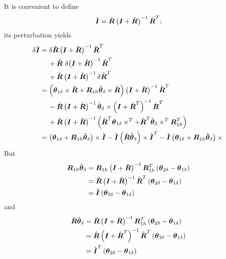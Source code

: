 \documentclass[10pt,dvips,fleqn]{report}
\newcommand{\T}[1]{\boldsymbol{#1}}
\begin{document}
It is convenient to define
\begin{equation}
	\hat{\T{I}} =
		\hat{\T{R}} \plbr{\T{I} + \tilde{\T{R}}}^{-1} \hat{\T{R}}^T ;
\end{equation}
its perturbation yields
\begin{align}
	\delta\hat{\T{I}}
	&= \delta\hat{\T{R}} \plbr{\T{I} + \tilde{\T{R}}}^{-1} \hat{\T{R}}^T
	\nonumber \\
	& \mbox{\hspace{12pt}}
	+ \hat{\T{R}} \ \delta\! \plbr{\T{I} + \tilde{\T{R}}}^{-1} \hat{\T{R}}^T
	\nonumber \\
	& \mbox{\hspace{12pt}}
	+ \hat{\T{R}} \plbr{\T{I} + \tilde{\T{R}}}^{-1} \delta\hat{\T{R}}^T \\
	&= \plbr{
		\T{\theta}_{1\delta} \times \hat{\T{R}}
		+ \T{R}_{1h} \tilde{\T{\theta}}_{\delta} \times \tilde{\T{R}}
	} \plbr{\T{I} + \tilde{\T{R}}}^{-1} \hat{\T{R}}^T
	\nonumber \\
	& \mbox{\hspace{12pt}}
	- \hat{\T{R}} \plbr{\T{I} + \tilde{\T{R}}}^{-1}
		\tilde{\T{\theta}}_{\delta} \times
		\plbr{\T{I} + \tilde{\T{R}}^T}^{-1}
		\hat{\T{R}}^T
	\nonumber \\
	& \mbox{\hspace{12pt}}
	+ \hat{\T{R}} \plbr{\T{I} + \tilde{\T{R}}}^{-1} \plbr{
		\hat{\T{R}}^T \T{\theta}_{1\delta} \times^T
		+ \tilde{\T{R}}^T \tilde{\T{\theta}}_{\delta} \times^T \T{R}_{1h}^T
	} \\
	&= \plbr{
		\T{\theta}_{1\delta}
		+ \T{R}_{1h} \tilde{\T{\theta}}_{\delta}
	} \times \hat{\T{I}}
	- \hat{\T{I}} \plbr{\hat{\T{R}} \tilde{\T{\theta}}_{\delta}} \times \hat{\T{I}}^T
	- \hat{\T{I}} \plbr{
		\T{\theta}_{1\delta}
		+ \T{R}_{1h} \tilde{\T{\theta}}_{\delta}
	}\times{}
\end{align}
But
\begin{align}
	\T{R}_{1h} \tilde{\T{\theta}}_{\delta}
	&= \T{R}_{1h} \plbr{\T{I} + \tilde{\T{R}}}^{-1} \T{R}_{1h}^T \plbr{
		\T{\theta}_{2\delta} - \T{\theta}_{1\delta}
	} \\
	&= \hat{\T{R}} \plbr{\T{I} + \tilde{\T{R}}}^{-1} \hat{\T{R}}^T \plbr{
		\T{\theta}_{2\delta} - \T{\theta}_{1\delta}
	} \\
	&= \hat{\T{I}} \plbr{
		\T{\theta}_{2\delta} - \T{\theta}_{1\delta}
	} 
\end{align}
and
\begin{align}
	\hat{\T{R}} \tilde{\T{\theta}}_{\delta}
	&= \hat{\T{R}} \plbr{\T{I} + \tilde{\T{R}}}^{-1} \T{R}_{1h}^T \plbr{
		\T{\theta}_{2\delta} - \T{\theta}_{1\delta}
	} \\
	&= \hat{\T{R}} \plbr{\T{I} + \tilde{\T{R}}^T}^{-1} \hat{\T{R}}^T \plbr{
		\T{\theta}_{2\delta} - \T{\theta}_{1\delta}
	} \\
	&= \hat{\T{I}}^T \plbr{
		\T{\theta}_{2\delta} - \T{\theta}_{1\delta}
	} 
\end{align}
\end{document}
